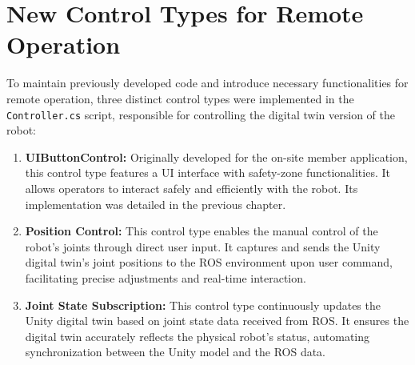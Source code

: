     
    
    
    \section{New Control Types for Remote Operation}
    To maintain previously developed code and introduce necessary functionalities for remote operation, three distinct control types were implemented in the \texttt{Controller.cs} script, responsible for controlling the digital twin version of the robot:
    
    \begin{enumerate}
        \item \textbf{UIButtonControl:} Originally developed for the on-site member application, this control type features a UI interface with safety-zone functionalities. It allows operators to interact safely and efficiently with the robot. Its implementation was detailed in the previous chapter.
        \item \textbf{Position Control:} This control type enables the manual control of the robot's joints through direct user input. It captures and sends the Unity digital twin's joint positions to the ROS environment upon user command, facilitating precise adjustments and real-time interaction.
        \item \textbf{Joint State Subscription:} This control type continuously updates the Unity digital twin based on joint state data received from ROS. It ensures the digital twin accurately reflects the physical robot's status, automating synchronization between the Unity model and the ROS data.
    \end{enumerate}
    
        

